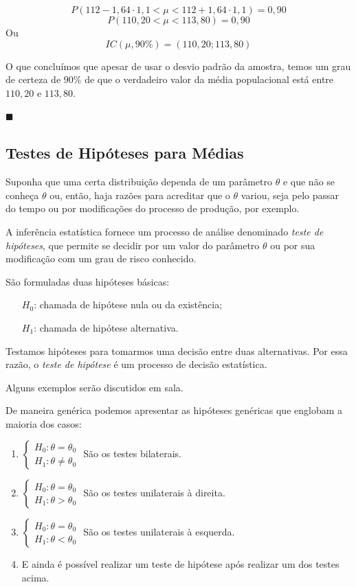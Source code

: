 \documentclass[oneside,a4paper,12pt]{article}
\begin{document}
$$P(112 - 1,64 \cdot 1,1 < \mu < 112 + 1,64 \cdot 1,1) = 0,90$$
$$P(110,20<\mu<113,80) = 0,90$$
Ou
$$IC(\mu,90\%) = (110,20;113,80)$$

O que concluímos que apesar de usar o desvio padrão da amostra, temos um grau de certeza de $90\%$ de que o verdadeiro valor da média populacional está entre $110,20$ e $113,80$.

\begin{flushright}
	$\blacksquare$
\end{flushright}

\subsection{Testes de Hipóteses para Médias}

Suponha que uma certa distribuição dependa de um parâmetro $\theta$ e que não se conheça $\theta$ ou, então, haja razões para acreditar que o $\theta$ variou, seja pelo passar do tempo ou por modificações do processo de produção, por exemplo.

A inferência estatística fornece um processo de análise denominado \emph{teste de hipóteses}, que permite se decidir por um valor do parâmetro $\theta$ ou por sua modificação com um grau de risco conhecido.

São formuladas duas hipóteses básicas:
\begin{itemize}
	\item [$H_0$:] chamada de hipótese nula ou da existência;
	\item [$H_1$:] chamada de hipótese alternativa.
\end{itemize}

Testamos hipóteses para tomarmos uma decisão entre duas alternativas. Por essa razão, o \emph{teste de hipótese} é um processo de decisão estatística.

Alguns exemplos serão discutidos em sala.

De maneira genérica podemos apresentar as hipóteses genéricas que englobam a maioria dos casos:
\begin{enumerate}
	\item $\begin{cases}
	H_0: \theta = \theta_0\\
	H_1: \theta \neq \theta_0
	\end{cases}$
	São os testes bilaterais.
	\item $\begin{cases}
	H_0: \theta = \theta_0\\
	H_1: \theta > \theta_0
	\end{cases}$
	São os testes unilaterais à direita.
	\item $\begin{cases}
	H_0: \theta = \theta_0\\
	H_1: \theta < \theta_0
	\end{cases}$
	São os testes unilaterais à esquerda.
	\item E ainda é possível realizar um teste de hipótese após realizar um dos testes acima.
\end{enumerate}
	
\end{document}
